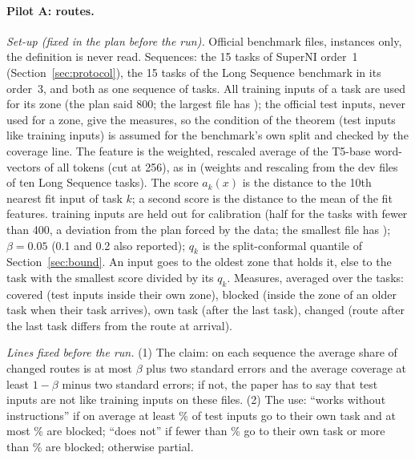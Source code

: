 \paragraph{Pilot A: routes.} \emph{Set-up (fixed in the plan before the run).} Official benchmark files, instances only, the definition is never read. Sequences: the 15 tasks of SuperNI order~1 (Section~\ref{sec:protocol}), the 15 tasks of the Long Sequence benchmark in its order~3, and both as one sequence of \BoundTasksBoth{} tasks. All training inputs of a task are used for its zone (the plan said 800; the largest file has \BoundTrainMax{}); the official test inputs, never used for a zone, give the measures, so the condition of the theorem (test inputs like training inputs) is assumed for the benchmark's own split and checked by the coverage line. The feature is the weighted, rescaled average of the T5-base word-vectors of all tokens (cut at 256), as in \centre{} (weights and rescaling from the dev files of ten Long Sequence tasks). The score $a_k(x)$ is the distance to the 10th nearest fit input of task $k$; a second score is the distance to the mean of the fit features. \BoundMCal{} training inputs are held out for calibration (half for the \BoundSmallTasks{} tasks with fewer than 400, a deviation from the plan forced by the data; the smallest file has \BoundSmallMin{}); $\beta = 0.05$ (0.1 and 0.2 also reported); $q_k$ is the split-conformal quantile of Section~\ref{sec:bound}. An input goes to the oldest zone that holds it, else to the task with the smallest score divided by its $q_k$. Measures, averaged over the tasks: covered (test inputs inside their own zone), blocked (inside the zone of an older task when their task arrives), own task (after the last task), changed (route after the last task differs from the route at arrival).

\emph{Lines fixed before the run.} (1) The claim: on each sequence the average share of changed routes is at most $\beta$ plus two standard errors and the average coverage at least $1 - \beta$ minus two standard errors; if not, the paper has to say that test inputs are not like training inputs on these files. (2) The use: ``works without instructions'' if on average at least \BoundLineOwn{}\% of test inputs go to their own task and at most \BoundLineBlock{}\% are blocked; ``does not'' if fewer than \BoundLineNotOwn{}\% go to their own task or more than \BoundLineNotBlock{}\% are blocked; otherwise partial.

\begin{table}[t]
  \caption{Pilot A, no instruction (routes only; $\beta = 0.05$; means over the tasks of a sequence, in \%). Covered: promised at least \BoundCovPromised{}\% on average. Changed: promised at most \BoundAlpha{}\%. Blocked, own task: as in the text. ``sentence enc.'': frozen all-MiniLM-L6-v2 on the instance text, mean pooling; ``word-vec.'': the word-vector feature. Scores: 10-NN, distance to the 10th nearest fit input; mean, distance to the mean of the fit inputs; ratio, defined in the text.}
  \label{tab:boundpilot}
  \centering
  \footnotesize
  \setlength{\tabcolsep}{3pt}
  
\end{table}

